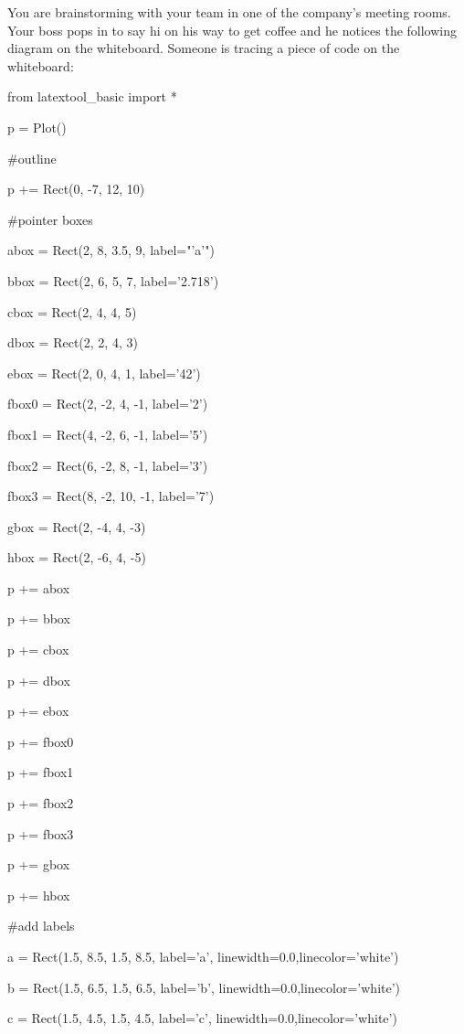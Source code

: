 You are brainstorming with your team in one of the company's meeting rooms. Your boss pops in to say hi on his way to get coffee and he notices the following diagram on the whiteboard. Someone is tracing a piece of code on the whiteboard:

\begin{python}

from latextool_basic import *

p = Plot()

#outline

p += Rect(0, -7, 12, 10)



#pointer boxes

abox = Rect(2, 8, 3.5, 9, label="'a'")

bbox = Rect(2, 6, 5, 7, label='2.718')

cbox = Rect(2, 4, 4, 5)

dbox = Rect(2, 2, 4, 3)

ebox = Rect(2, 0, 4, 1, label='42')

fbox0 = Rect(2, -2, 4, -1, label='2')

fbox1 = Rect(4, -2, 6, -1, label='5')

fbox2 = Rect(6, -2, 8, -1, label='3')

fbox3 = Rect(8, -2, 10, -1, label='7')

gbox = Rect(2, -4, 4, -3)

hbox = Rect(2, -6, 4, -5)



p += abox

p += bbox

p += cbox

p += dbox

p += ebox

p += fbox0

p += fbox1

p += fbox2

p += fbox3

p += gbox

p += hbox



#add labels

a = Rect(1.5, 8.5, 1.5, 8.5, label='a', linewidth=0.0,linecolor='white')

b = Rect(1.5, 6.5, 1.5, 6.5, label='b', linewidth=0.0,linecolor='white')

c = Rect(1.5, 4.5, 1.5, 4.5, label='c', linewidth=0.0,linecolor='white')


\end{python}
